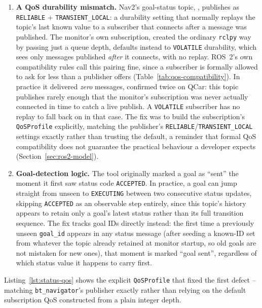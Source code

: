\begin{enumerate}
  \item \textbf{A QoS durability mismatch.} Nav2's goal-status topic,
    \texttt{}, publishes as
    \texttt{RELIABLE} + \texttt{TRANSIENT\_LOCAL}: a durability setting
    that normally replays the topic's last known value to a subscriber
    that connects after a message was published. The monitor's own
    subscription, created the ordinary \texttt{rclpy} way by passing
    just a queue depth, defaults instead to \texttt{VOLATILE}
    durability, which sees only messages published \emph{after} it
    connects, with no replay. ROS~2's own compatibility rules call this
    pairing fine, since a subscriber is formally allowed to ask for
    less than a publisher offers (Table~\ref{tab:qos-compatibility}).
    In practice it delivered \emph{zero} messages, confirmed twice on
    QCar: this topic publishes rarely enough that the monitor's
    subscription was never actually connected in time to catch a live
    publish. A \texttt{VOLATILE} subscriber has no replay to fall back
    on in that case. The fix was to build the subscription's
    \texttt{QoSProfile} explicitly, matching the publisher's
    \texttt{RELIABLE}/\texttt{TRANSIENT\_LOCAL} settings exactly rather
    than trusting the default, a reminder that formal QoS compatibility
    does not guarantee the practical behaviour a developer expects
    (Section~\ref{sec:ros2-model}).
  \item \textbf{Goal-detection logic.} The tool originally marked a
    goal as ``sent'' the moment it first saw status code
    \texttt{ACCEPTED}. In practice, a goal can jump straight from
    unseen to \texttt{EXECUTING} between two consecutive status
    updates, skipping \texttt{ACCEPTED} as an observable step entirely,
    since this topic's history appears to retain only a goal's latest
    status rather than its full transition sequence. The fix tracks
    goal IDs directly instead: the first time a previously unseen
    \texttt{goal\_id} appears in any status message (after seeding a
    known-ID set from whatever the topic already retained at monitor
    startup, so old goals are not mistaken for new ones), that moment
    is marked ``goal sent'', regardless of which status value it
    happens to carry first.
\end{enumerate}

Listing~\ref{lst:status-qos} shows the explicit \texttt{QoSProfile}
that fixed the first defect -- matching \texttt{bt\_navigator}'s
publisher exactly rather than relying on the default subscription QoS
constructed from a plain integer depth.

